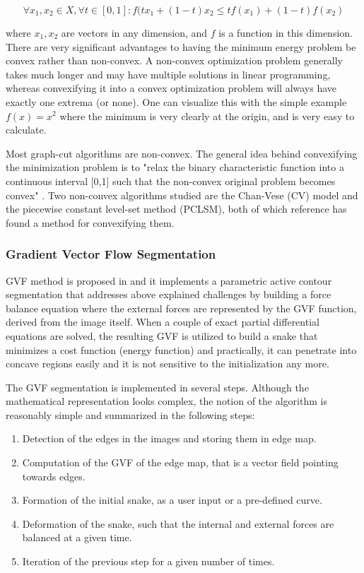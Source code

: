 \documentclass{article}
\begin{document}
\begin{equation}
\forall x_1,x_2 \in X, \forall t\in [0,1]: f(tx_1 + (1-t)x_2 \leq tf(x_1) + (1-t)f(x_2)
\label{eq:convex}
\end{equation}

where $x_1,x_2$ are vectors in any dimension, and $f$ is a function in this dimension. There are very significant advantages to having the minimum energy problem be convex rather than non-convex. A non-convex optimization problem generally takes much longer and may have multiple solutions in linear programming, whereas convexifying it into a convex optimization problem will always have exactly one extrema (or none). One can visualize this with the simple example $f(x)=x^2$ where the minimum is very clearly at the origin, and is very easy to calculate.

Most graph-cut algorithms are non-convex. The general idea behind convexifying the minimization problem is to "relax the binary characteristic function into a continuous interval [0,1] such that the non-convex original problem becomes convex" \cite{jun}. Two non-convex algorithms studied are the Chan-Vese (CV) model and the piecewise constant level-set method (PCLSM), both of which reference \cite{jun} has found a method for convexifying them.








\subsubsection*{Gradient Vector Flow Segmentation}


GVF method is proposed in \cite{gvf} and it implements a parametric active contour segmentation that addresses above explained challenges by building a force balance equation where the external forces are represented by the GVF function, derived from the image itself. When a couple of exact partial differential equations are solved, the resulting GVF is utilized to build a snake that minimizes a cost function (energy function) and practically, it can penetrate into concave regions easily and it is not sensitive to the initialization any more. 

The GVF segmentation is implemented in several steps. Although the mathematical representation looks complex, the notion of the algorithm is reasonably simple and summarized in the following steps:
\begin{enumerate}
\item Detection of the edges in the images and storing them in edge map.
\item Computation of the GVF of the edge map, that is a vector field pointing towards edges.
\item Formation of the initial snake, as a user input or a pre-defined curve.
\item Deformation of the snake, such that the internal and external forces are balanced at a given time.
\item Iteration of the previous step for a given number of times.
\end{enumerate}
\end{document}
